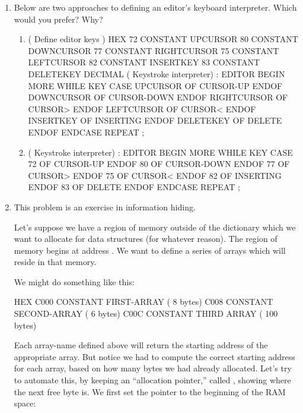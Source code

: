 \begin{enumerate}
\item Below are two approaches to defining an editor's keyboard
interpreter.  Which would you prefer? Why?

\begin{enumerate}
\item \begin{Code}
( Define editor keys )
HEX
72 CONSTANT UPCURSOR
80 CONSTANT DOWNCURSOR
77 CONSTANT RIGHTCURSOR
75 CONSTANT LEFTCURSOR
82 CONSTANT INSERTKEY
83 CONSTANT DELETEKEY
DECIMAL
( Keystroke interpreter)
: EDITOR
   BEGIN  MORE WHILE  KEY   CASE
      UPCURSOR     OF  CURSOR-UP     ENDOF
      DOWNCURSOR   OF  CURSOR-DOWN   ENDOF
      RIGHTCURSOR  OF  CURSOR>       ENDOF
      LEFTCURSOR   OF  CURSOR<       ENDOF
      INSERTKEY    OF  INSERTING     ENDOF
      DELETEKEY    OF  DELETE        ENDOF
   ENDCASE  REPEAT ;
\end{Code}
\medbreak\item \begin{Code}
( Keystroke interpreter)
: EDITOR
   BEGIN  MORE WHILE  KEY   CASE
      72 OF  CURSOR-UP     ENDOF
      80 OF  CURSOR-DOWN   ENDOF
      77 OF  CURSOR>       ENDOF
      75 OF  CURSOR<       ENDOF
      82 OF  INSERTING     ENDOF
      83 OF  DELETE        ENDOF
   ENDCASE  REPEAT ;
\end{Code}
\end{enumerate}

\item This problem is an exercise in information hiding.

Let's suppose we have a region of memory outside of the \Forth{}
dictionary which we want to allocate for data structures (for whatever
reason). The region of memory begins at  address .
We want to define a series of arrays which will reside in that memory.

 We might do something like this:

\begin{Code}
HEX
C000 CONSTANT FIRST-ARRAY  ( 8 bytes)
C008 CONSTANT SECOND-ARRAY  ( 6 bytes)
C00C CONSTANT THIRD ARRAY  ( 100 bytes)
\end{Code}
Each array-name defined above will return the starting address of the
appropriate array. But notice we had to compute the correct starting
address for each array, based on how many bytes we had already
allocated. Let's try to automate this, by keeping an ``allocation
pointer,'' called , showing where the next free byte is. We first
set the pointer to the beginning of the RAM space:


\end{enumerate}

